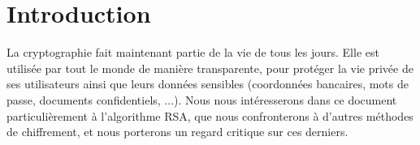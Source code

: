 \chapter{Introduction}
La cryptographie fait maintenant partie de la vie de tous les jours. Elle est utilisée par tout le monde de manière transparente, pour protéger la vie privée de ses utilisateurs ainsi que leurs données sensibles (coordonnées bancaires, mots de passe, documents confidentiels, ...). Nous nous intéresserons dans ce document particulièrement à l'algorithme RSA, que nous confronterons à d'autres méthodes de chiffrement, et nous porterons un regard critique sur ces derniers.
